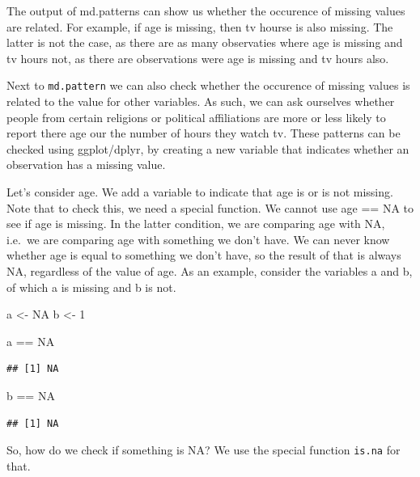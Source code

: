 \documentclass[]{tufte-book}
\newenvironment{Shaded}{}{}
\newcommand{\DecValTok}[1]{\textcolor[rgb]{0.25,0.63,0.44}{#1}}
\newcommand{\StringTok}[1]{\textcolor[rgb]{0.25,0.44,0.63}{#1}}
\newcommand{\OtherTok}[1]{\textcolor[rgb]{0.00,0.44,0.13}{#1}}
\newcommand{\OperatorTok}[1]{\textcolor[rgb]{0.40,0.40,0.40}{#1}}
\newcommand{\NormalTok}[1]{#1}
\begin{document}
The output of md.patterns can show us whether the occurence of missing
values are related. For example, if age is missing, then tv hourse is
also missing. The latter is not the case, as there are as many
observaties where age is missing and tv hours not, as there are
observations were age is missing and tv hours also.

Next to \texttt{md.pattern} we can also check whether the occurence of
missing values is related to the value for other variables. As such, we
can ask ourselves whether people from certain religions or political
affiliations are more or less likely to report there age our the number
of hours they watch tv. These patterns can be checked using
ggplot/dplyr, by creating a new variable that indicates whether an
observation has a missing value.

Let's consider age. We add a variable to indicate that age is or is not
missing. Note that to check this, we need a special function. We cannot
use age == NA to see if age is missing. In the latter condition, we are
comparing age with NA, i.e.~we are comparing age with something we don't
have. We can never know whether age is equal to something we don't have,
so the result of that is always NA, regardless of the value of age. As
an example, consider the variables a and b, of which a is missing and b
is not.

\begin{Shaded}
\begin{Highlighting}[]
\NormalTok{a <-}\StringTok{ }\OtherTok{NA}
\NormalTok{b <-}\StringTok{ }\DecValTok{1}

\NormalTok{a }\OperatorTok{==}\StringTok{ }\OtherTok{NA}
\end{Highlighting}
\end{Shaded}

\begin{verbatim}
## [1] NA
\end{verbatim}

\begin{Shaded}
\begin{Highlighting}[]
\NormalTok{b }\OperatorTok{==}\StringTok{ }\OtherTok{NA}
\end{Highlighting}
\end{Shaded}

\begin{verbatim}
## [1] NA
\end{verbatim}

So, how do we check if something is NA? We use the special function
\texttt{is.na} for that.
\end{document}
